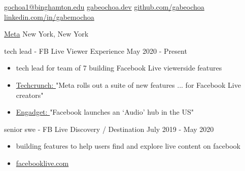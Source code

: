 \documentclass[11pt]{article}
\begin{document}

\begin{center}
\nobreakvspace{0.3em}  %
\end{center}

\href{mailto:gochoa1@binghamton.edu}{gochoa1@binghamton.edu}\sbull
\href{https://gabeochoa.dev/}{gabeochoa.dev}\sbull
\href{https://github.com/gabeochoa}{github.com/gabeochoa}\sbull
\href{https://www.linkedin.com/in/gabemochoa}{linkedin.com/in/gabemochoa}



\spacedhrule{0.2em}{0.2em}  %

\headedsection  %
{\href{http://www.about.fb.com/}{Meta}}
{New York, New York}
{
    \headedsubsection
    {tech lead - FB Live Viewer Experience}
    {May 2020 - Present}
    {
        \begin{itemize}
            \item tech lead for team of 7 building Facebook Live viewerside features
            \item 
                \href{https://techcrunch.com/2021/12/09/meta-rolls-out-a-suite-of-new-features-and-discovery-tools-for-facebook-live-creators}{Techcrunch: }
                "Meta rolls out a suite of new features ... for Facebook Live creators"
            \item 
                \href{https://www.engadget.com/facebook-audio-content-hub-live-audio-rooms-podcasts-170633543.html}
                {Engadget: }
                "Facebook launches an ‘Audio’ hub in the US"
        \end{itemize}

    }

    \headedsubsection
    {senior swe - FB Live Discovery / Destination} 
    {July 2019 - May 2020}
    {
        \begin{itemize}
            \item building features to help users find and explore live content on facebook 
            \item {\href{http://www.facebooklive.com/}{facebooklive.com}}
        \end{itemize}

    }
}
\end{document}

